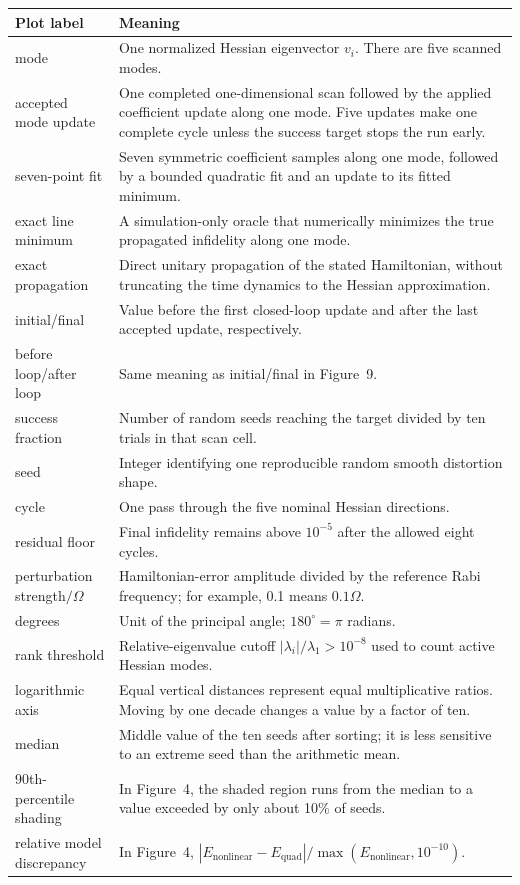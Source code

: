 \documentclass[11pt]{article}
\newcommand{\Om}{\Omega}
\newcommand{\target}{10^{-5}}
\begin{document}
\begin{longtable}{p{}p{}}
\toprule
Plot label & Meaning\\
\midrule
\endhead
mode & One normalized Hessian eigenvector $v_i$.  There are five scanned
modes.\\
accepted mode update & One completed one-dimensional scan followed by the
applied coefficient update along one mode.  Five updates make one complete
cycle unless the success target stops the run early.\\
seven-point fit & Seven symmetric coefficient samples along one mode,
followed by a bounded quadratic fit and an update to its fitted minimum.\\
exact line minimum & A simulation-only oracle that numerically minimizes the
true propagated infidelity along one mode.\\
exact propagation & Direct unitary propagation of the stated Hamiltonian,
without truncating the time dynamics to the Hessian approximation.\\
initial/final & Value before the first closed-loop update and after the last
accepted update, respectively.\\
before loop/after loop & Same meaning as initial/final in Figure~9.\\
success fraction & Number of random seeds reaching the target divided by ten
trials in that scan cell.\\
seed & Integer identifying one reproducible random smooth distortion shape.\\
cycle & One pass through the five nominal Hessian directions.\\
residual floor & Final infidelity remains above $\target$ after the allowed
eight cycles.\\
perturbation strength$/\Om$ & Hamiltonian-error amplitude divided by the
reference Rabi frequency; for example, 0.1 means $0.1\Om$.\\
degrees & Unit of the principal angle; $180^\circ=\pi$ radians.\\
rank threshold & Relative-eigenvalue cutoff
$|\lambda_i|/\lambda_1>10^{-8}$ used to count active Hessian modes.\\
logarithmic axis & Equal vertical distances represent equal multiplicative
ratios.  Moving by one decade changes a value by a factor of ten.\\
median & Middle value of the ten seeds after sorting; it is less sensitive to
an extreme seed than the arithmetic mean.\\
90th-percentile shading & In Figure~4, the shaded region runs from the median
to a value exceeded by only about 10\% of seeds.\\
relative model discrepancy & In Figure~4,
$|E_{\mathrm{nonlinear}}-E_{\mathrm{quad}}|/
\max(E_{\mathrm{nonlinear}},10^{-10})$.\\
\bottomrule
\end{longtable}
\end{document}
